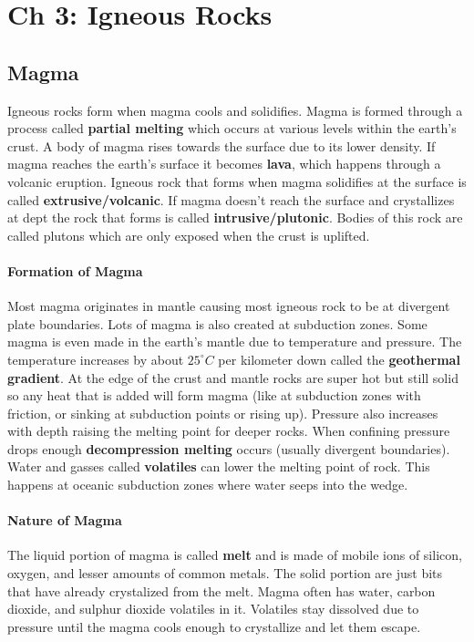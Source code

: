 \documentclass{article}
\begin{document}


\section{Ch 3: Igneous Rocks} %
\label{sec:ch_3_igneous_rocks}
\subsection{Magma} %
\label{sub:magma}
Igneous rocks form when magma cools and solidifies. Magma is formed through a process called \textbf{partial melting} which occurs at various levels within the earth's crust. A body of magma rises towards the surface due to its lower density. If magma reaches the earth's surface it becomes \textbf{lava}, which happens through a volcanic eruption. Igneous rock that forms when magma solidifies at the surface is called \textbf{extrusive/volcanic}. If magma doesn't reach the surface and crystallizes at dept the rock that forms is called \textbf{intrusive/plutonic}. Bodies of this rock are called plutons which are only exposed when the crust is uplifted.

\paragraph{Formation of Magma} %
\label{par:formation_of_magma}
Most magma originates in mantle causing most igneous rock to be at divergent plate boundaries. Lots of magma is also created at subduction zones. Some magma is even made in the earth's mantle due to temperature and pressure. The temperature increases by about $25^{\circ} C$ per kilometer down called the \textbf{geothermal gradient}. At the edge of the crust and mantle rocks are super hot but still solid so any heat that is added will form magma (like at subduction zones with friction, or sinking at subduction points or rising up). Pressure also increases with depth raising the melting point for deeper rocks. When confining pressure drops enough \textbf{decompression melting} occurs (usually divergent boundaries). Water and gasses called \textbf{volatiles} can lower the melting point of rock. This happens at oceanic subduction zones where water seeps into the wedge.

\paragraph{Nature of Magma} %
\label{par:nature_of_magma}
The liquid portion of magma is called \textbf{melt} and is made of mobile ions of silicon, oxygen, and lesser amounts of common metals. The solid portion are just bits that have already crystalized from the melt. Magma often has water, carbon dioxide, and sulphur dioxide volatiles in it. Volatiles stay dissolved due to pressure until the magma cools enough to crystallize and let them escape.
\end{document}
